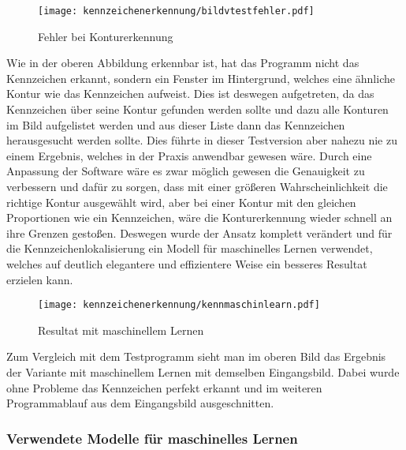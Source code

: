 \begin{figure}[H]
    \centering
    \texttt{[image: kennzeichenerkennung/bildvtestfehler.pdf]}
    \caption{Fehler bei Konturerkennung}
\end{figure}

Wie in der oberen Abbildung erkennbar ist, hat das Programm nicht das Kennzeichen erkannt, sondern ein Fenster im Hintergrund, welches eine ähnliche Kontur 
wie das Kennzeichen aufweist. Dies ist deswegen aufgetreten, da das Kennzeichen über seine Kontur gefunden werden sollte und dazu alle Konturen im Bild aufgelistet 
werden und aus dieser Liste dann das Kennzeichen herausgesucht werden sollte. Dies führte in dieser Testversion aber nahezu nie zu einem Ergebnis, welches in 
der Praxis anwendbar gewesen wäre. Durch eine Anpassung der Software wäre es zwar möglich gewesen die Genauigkeit zu verbessern und dafür zu sorgen, dass mit 
einer größeren Wahrscheinlichkeit die richtige Kontur ausgewählt wird, aber bei einer Kontur mit den gleichen Proportionen wie ein Kennzeichen, wäre die Konturerkennung 
wieder schnell an ihre Grenzen gestoßen. Deswegen wurde der Ansatz komplett verändert und für die Kennzeichenlokalisierung ein Modell für maschinelles Lernen 
verwendet, welches auf deutlich elegantere und effizientere Weise ein besseres Resultat erzielen kann.

\begin{figure}[H]
    \centering
    \texttt{[image: kennzeichenerkennung/kennmaschinlearn.pdf]}
    \caption{Resultat mit maschinellem Lernen}
\end{figure}

Zum Vergleich mit dem Testprogramm sieht man im oberen Bild das Ergebnis der Variante mit maschinellem Lernen mit demselben Eingangsbild. Dabei wurde ohne 
Probleme das Kennzeichen perfekt erkannt und im weiteren Programmablauf aus dem Eingangsbild ausgeschnitten.

\subsubsection{Verwendete Modelle für maschinelles Lernen}

